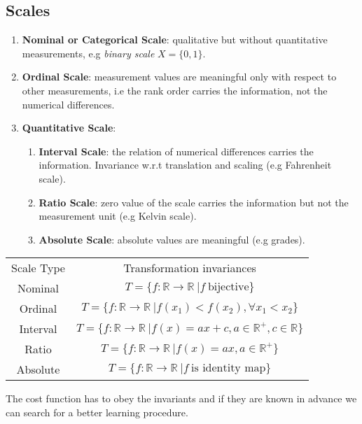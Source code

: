 \documentclass[twoside]{article}
\begin{document}
\subsection{Scales}
\begin{enumerate}
    \item \textbf{Nominal or Categorical Scale}: qualitative but without quantitative measurements, e.g \textit{binary scale} $X = \{0,1\}$.
    \item \textbf{Ordinal Scale}: measurement values are meaningful only with respect to other measurements, i.e the rank order carries the information, not the numerical differences.
    \item \textbf{Quantitative Scale}:
    \renewcommand{\theenumii}{\roman{enumii}}
    \begin{enumerate}
        \item \textbf{Interval Scale}: the relation of numerical differences carries the information. Invariance w.r.t translation and scaling (e.g Fahrenheit scale).
        \item \textbf{Ratio Scale}: zero value of the scale carries the information but not the measurement unit (e.g Kelvin scale).
        \item \textbf{Absolute Scale}: absolute values are meaningful (e.g grades).
    \end{enumerate}
\end{enumerate}
\begin{center}
\begin{tabular}{ |c|c| } 
 \hline
 Scale Type & Transformation invariances \\ 
 Nominal & $T = \{f : \mathbb{R} \rightarrow \mathbb{R} \:| f \: \text{bijective}\}$ \\ 
 Ordinal & $T = \{f : \mathbb{R} \rightarrow \mathbb{R} \:| f(x_1) < f(x_2), \forall x_1 < x_2\}$ \\ 
 Interval & $T = \{f : \mathbb{R} \rightarrow \mathbb{R} \:| f(x) = ax + c,  a \in \mathbb{R}^+, c \in \mathbb{R}\}$ \\ 
 Ratio & $T = \{f : \mathbb{R} \rightarrow \mathbb{R} \:| f(x) = ax,  a \in \mathbb{R}^+\}$ \\
 Absolute & $T = \{f : \mathbb{R} \rightarrow \mathbb{R} \:| f \: \text{is identity map}\}$ \\ 
 \hline
\end{tabular}
\end{center}
The cost function has to obey the invariants and if they are known in advance we can search for a better learning procedure.
\end{document}
